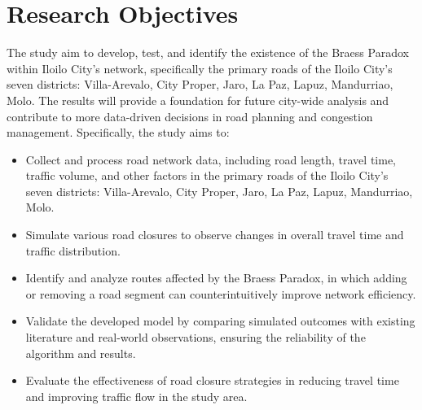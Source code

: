 \section{Research Objectives}
\label{sec:research_objectives}

The study aim to develop, test, and identify the existence of the Braess Paradox within Iloilo City's network, specifically the primary roads of the Iloilo City's seven districts: Villa-Arevalo, City Proper, Jaro, La Paz, Lapuz, Mandurriao, Molo. The results will provide a foundation for future city-wide analysis and contribute to more data-driven decisions in road planning and congestion management. Specifically, the study aims to:

\begin{itemize}
    \item Collect and process road network data, including road length, travel time, traffic volume, and other factors in the primary roads of the Iloilo City's seven districts: Villa-Arevalo, City Proper, Jaro, La Paz, Lapuz, Mandurriao, Molo.
    \item Simulate various road closures to observe changes in overall travel time and traffic distribution.
    \item Identify and analyze routes affected by the Braess Paradox, in which adding or removing a road segment can counterintuitively improve network efficiency.
    \item Validate the developed model by comparing simulated outcomes with existing literature and real-world observations, ensuring the reliability of the algorithm and results.
    \item Evaluate the effectiveness of road closure strategies in reducing travel time and improving traffic flow in the study area.
\end{itemize}